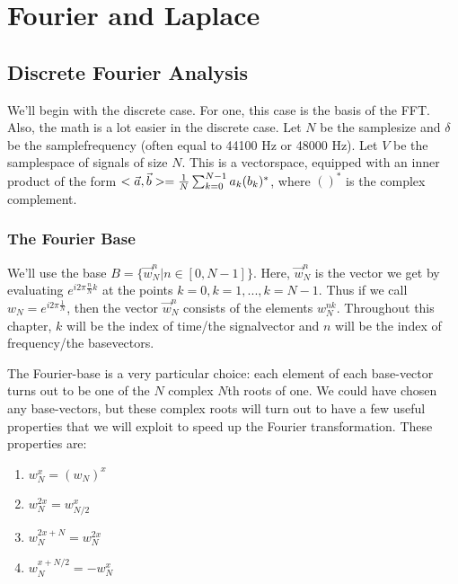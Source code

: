 \section{Fourier and Laplace}

\subsection{Discrete Fourier Analysis}

We'll begin with the discrete case. For one, this case is the basis of the FFT. Also, the math is a lot easier in the discrete case. Let $N$ be the samplesize and $\delta$ be the samplefrequency (often equal to 44100 Hz or 48000 Hz). Let $V$ be the samplespace of signals of size $N$. This is a vectorspace, equipped with an inner product of the form $< \vec{a} , \vec{b} > = \frac{1}{N} \sum_{k=0}^{N-1} a_k (b_k)^*$, where $()^*$ is the complex complement.

\subsubsection{The Fourier Base}


We'll use the base $B = \{ \vec{w}_N^n | n \in [0, N-1]\}$. Here, $\vec{w}_N^n$ is the vector we get by evaluating $e^{i 2\pi \frac{n}{N} k}$ at the points $k=0, k=1, ..., k=N-1$. Thus if we call $w_N = e^{i 2 \pi \frac{1}{N}}$, then the vector $\vec{w}_N^n$ consists of the elements $w_N^{nk}$. Throughout this chapter, $k$ will be the index of time/the signalvector and $n$ will be the index of frequency/the basevectors.

The Fourier-base is a very particular choice: each element of each base-vector turns out to be one of the $N$ complex $N$th roots of one. We could have chosen any base-vectors, but these complex roots will turn out to have a few useful properties that we will exploit to speed up the Fourier transformation. These properties are:

\begin{enumerate}
    \item $w_N^x = (w_N)^x$
    \item $w_N^{2x} = w_{N/2}^x$
    \item $w_N^{2x+N} = w_N^{2x}$
    \item $w_N^{x+N/2} = - w_N^x$
\end{enumerate}

